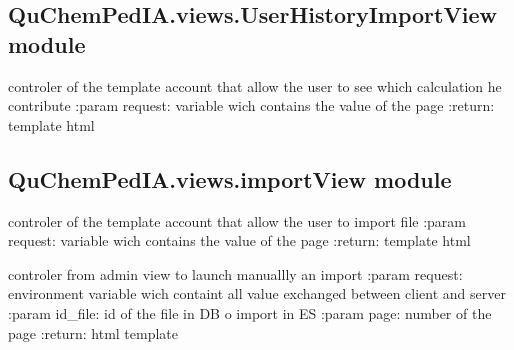 \documentclass[letterpaper,10pt,english]{sphinxmanual}
\begin{document}
\subsection{QuChemPedIA.views.UserHistoryImportView module}
\label{\detokenize{QuChemPedIA.views:module-QuChemPedIA.views.UserHistoryImportView}}\label{\detokenize{QuChemPedIA.views:quchempedia-views-userhistoryimportview-module}}

\begin{fulllineitems}
\label{\detokenize{QuChemPedIA.views:QuChemPedIA.views.UserHistoryImportView.user_history_import}}
controler of the template account that allow the user to see which calculation he contribute
:param request: variable wich contains the value of the page
:return: template html

\end{fulllineitems}



\subsection{QuChemPedIA.views.importView module}
\label{\detokenize{QuChemPedIA.views:module-QuChemPedIA.views.importView}}\label{\detokenize{QuChemPedIA.views:quchempedia-views-importview-module}}

\begin{fulllineitems}
\label{\detokenize{QuChemPedIA.views:QuChemPedIA.views.importView.import_view}}
controler of the template account that allow the user to import file
:param request: variable wich contains the value of the page
:return: template html

\end{fulllineitems}


\begin{fulllineitems}
\label{\detokenize{QuChemPedIA.views:QuChemPedIA.views.importView.launch_import}}
controler from admin view to launch manuallly an import
:param request: environment variable wich containt all value exchanged between client and server
:param id\_file: id of the file in DB o import in ES
:param page: number of the page
:return: html template

\end{fulllineitems}
\end{document}
